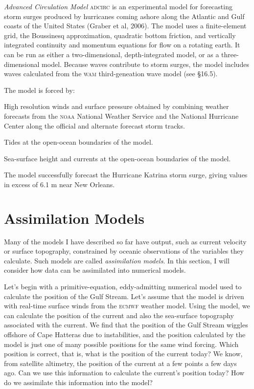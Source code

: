 \textit{Advanced Circulation Model} \textsc{adcirc} is an
experimental model for forecasting storm surges produced by hurricanes
coming ashore along the Atlantic and Gulf coasts of the United States
(Graber et al, 2006). The model uses a finite-element grid, the
Boussinesq approximation, quadratic bottom friction, and vertically
integrated continuity and momentum equations for flow on a rotating
earth. It can be run as either a two-dimensional, depth-integrated
model, or as a three-dimensional model. Because waves contribute to
storm surges, the model includes waves calculated from the
\textsc{wam} third-geneation wave model (see \S 16.5).

The model is forced by:
\begin{enumerate}
\vitem High resolution winds and surface pressure obtained by
combining weather forecasts from the \textsc{noaa} National Weather
Service and the National Hurricane Center along the official and
alternate forecast storm tracks.

\vitem Tides at the open-ocean boundaries of the model.

\vitem Sea-surface height and currents at the open-ocean boundaries of
the model.
\end{enumerate}
The model successfully forecast the Hurricane Katrina storm surge,
giving values in excess of 6.1 m near New Orleans.

\section{Assimilation Models}
Many of the models I have described so far have output, such as
current velocity or surface topography, constrained by oceanic
observations of the variables they calculate. Such models are called
\textit{assimilation models}. In this
section, I will consider how data can be assimilated into numerical
models.

Let's begin with a primitive-equation, eddy-admitting numerical model
used to calculate the position of the Gulf Stream. Let's assume that the model is driven with
real-time surface winds from the \textsc{ecmwf} weather model. Using
the model, we can calculate the position of the current and also the
sea-surface topography associated with the current.  We find that the
position of the Gulf Stream wiggles
offshore of Cape Hatteras due to instabilities, and the position
calculated by the model is just one of many possible positions for the
same wind forcing. Which position is correct, that is, what is the
position of the current today? We know, from satellite altimetry, the
position of the current at a few points a few days ago. Can we use
this information to calculate the current's position today? How do we
assimilate this information into the model?

